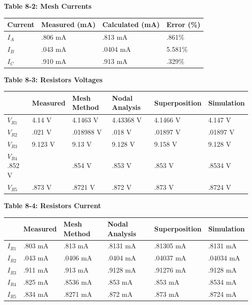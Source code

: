 \documentclass[a4paper]{article}
\begin{document}
\begin{center}
    \small\textbf{Table 8-2: Mesh Currents \cite{UNCC-ECE-Dept:2023}}
    \begin{tabular}{|p{3 cm}|p{3cm}|p{3 cm}|p{3 cm}|}
        \hline
        Current & Measured (mA) & Calculated (mA) & Error (\%) \\
        \hline
        $I_{A}$ & .806 mA & .813 mA & .861\%  \\
        \hline
        $I_{B}$ & .043 mA & .0404 mA & 5.581\% \\
        \hline
        $I_{C}$ & .910 mA & .913 mA & .329\% \\
        \hline
    \end{tabular}
\end{center}

\begin{center}
    \small\textbf{Table 8-3: Resistors Voltages \cite{UNCC-ECE-Dept:2023}}
    \begin{tabular}{|p{2 cm}|p{2cm}|p{2 cm}|p{2 cm}|p{2 cm}|p{2 cm}|}
        \hline
         & Measured & Mesh Method & Nodal Analysis & Superposition & Simulation \\
        \hline
        $V_{R1}$ & 4.14 V & 4.1463 V & 4.43368 V & 4.1466 V & 4.147 V \\
        \hline
        $V_{R2}$ & .021 V & .018988 V & .018 V & .01897 V & .01897 V \\
        \hline
        $V_{R3}$ & 9.123 V & 9.13 V & 9.128 V & 9.158 V & 9.128 V \\
        \hline
        $V_{R4}$ .852 V & & .854 V & .853 V & .853 V & .8534 V \\
        \hline
        $V_{R5}$ & .873 V & .8721 V & .872 V & .873 V & .8724 V \\
        \hline
    \end{tabular}
\end{center}

\begin{center}
    \small\textbf{Table 8-4: Resistors Current \cite{UNCC-ECE-Dept:2023}}
    \begin{tabular}{|p{2 cm}|p{2cm}|p{2 cm}|p{2 cm}|p{2 cm}|p{2 cm}|}
        \hline
         & Measured & Mesh Method & Nodal Analysis & Superposition & Simulation \\
        \hline
        $I_{R1}$ & .803 mA  & .813 mA & .8131 mA & .81305 mA &.8131 mA \\
        \hline
        $I_{R2}$ & .043 mA & .0406 mA & .0404 mA & .04037 mA  & .04034 mA\\
        \hline
        $I_{R3}$ & .911 mA & .913 mA & .9128 mA & .91276 mA & .9128 mA \\
        \hline
        $I_{R4}$ & .825 mA & .8536 mA & .853 mA &  .853 mA & .8534 mA\\
        \hline
        $I_{R5}$ & .834 mA & .8271 mA & .872 mA & .873 mA & .8724 mA\\
        \hline
    \end{tabular}
\end{center}
\end{document}
